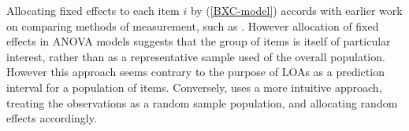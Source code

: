 \documentclass[12pt, a4paper]{report}
\theoremstyle{plain}
\theoremstyle{definition}
\theoremstyle{remark}
\begin{document}
	Allocating fixed effects to each item $i$ by (\ref{BXC-model}) accords with earlier work on comparing methods of measurement, such as \citet{Grubbs48}. However allocation of fixed effects in ANOVA models suggests that the group of items is itself of particular interest, rather than as a representative sample used of the overall population. However this approach seems contrary to the purpose of LOAs as a prediction interval for a population of items. Conversely, \citet{ARoy2009}
	uses a more intuitive approach, treating the observations as a random sample population, and allocating random effects accordingly.
	
	
%	
%	
%	
%	
%	
%	
%	
%	
%	
%	
	
\end{document}

